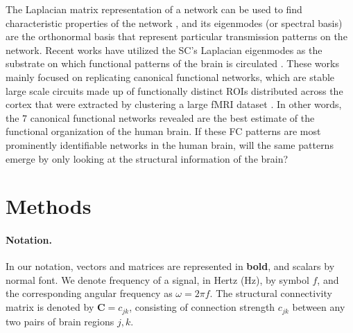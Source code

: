 \documentclass{article}
\begin{document}
The Laplacian matrix representation of a network can be used to find characteristic properties of the network \cite{Stewart1999}, and its eigenmodes (or spectral basis) are the orthonormal basis that represent particular transmission patterns on the network. Recent works have utilized the SC's Laplacian eigenmodes as the substrate on which functional patterns of the brain
is circulated \cite{Atasoy2016, preti_decoupling_2019}. These works mainly focused on replicating canonical functional networks, which are stable large scale circuits made up of functionally distinct ROIs distributed across the cortex that were extracted by clustering a large fMRI dataset \cite{Yeo2011}. In other words, the 7 canonical functional networks revealed are the best estimate of the functional organization of the human brain. If these FC patterns are most prominently identifiable networks in the human brain, will the same patterns emerge by only looking at the structural information of the brain?




\section{Methods}
\label{sec:methods}

\paragraph{Notation.} In our notation, vectors and matrices are represented in \textbf{bold}, and scalars by normal font. We denote frequency of a signal, in Hertz (Hz), by symbol $f$, and the corresponding angular frequency as $\omega = 2 \pi f$. The structural connectivity matrix is denoted by $\bm{C} = c_{jk}$, consisting of connection strength $c_{jk}$ between any two pairs of brain regions $j,k$.
\end{document}
